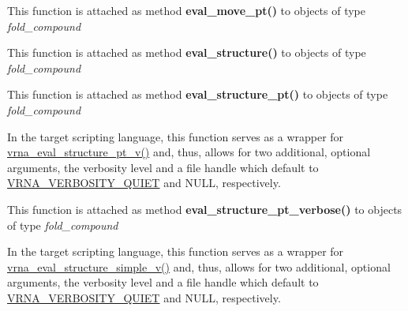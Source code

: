 \begin{DoxyRefList}
%
 This function is attached as method {\bfseries{eval\+\_\+move\+\_\+pt()}} to objects of type {\itshape fold\+\_\+compound}  
\item[Global \mbox{\hyperlink{group__eval_ga58f199f1438d794a265f3b27fc8ea631}{vrna\+\_\+eval\+\_\+structure}} (vrna\+\_\+fold\+\_\+compound\+\_\+t $\ast$vc, const char $\ast$structure)]\label{wrappers__wrappers000043}%
%
 This function is attached as method {\bfseries{eval\+\_\+structure()}} to objects of type {\itshape fold\+\_\+compound}  
\item[Global \mbox{\hyperlink{group__eval_gadbd09372ddfd7a450bbd590c96a6bfe4}{vrna\+\_\+eval\+\_\+structure\+\_\+pt}} (vrna\+\_\+fold\+\_\+compound\+\_\+t $\ast$vc, const short $\ast$pt)]\label{wrappers__wrappers000044}%
%
 This function is attached as method {\bfseries{eval\+\_\+structure\+\_\+pt()}} to objects of type {\itshape fold\+\_\+compound}  
\item[Global \mbox{\hyperlink{group__eval_ga0bba59b4d6e53461088666ff4aece7b0}{vrna\+\_\+eval\+\_\+structure\+\_\+pt\+\_\+simple}} (const char $\ast$string, const short $\ast$pt)]\label{wrappers__wrappers000071}%
%
 In the target scripting language, this function serves as a wrapper for \mbox{\hyperlink{group__eval_ga2c6533ba0afe4c88d335d8f1e0e2a48e}{vrna\+\_\+eval\+\_\+structure\+\_\+pt\+\_\+v()}} and, thus, allows for two additional, optional arguments, the verbosity level and a file handle which default to \mbox{\hyperlink{group__eval_gaf4afe19780b61b4962c613bde324128b}{V\+R\+N\+A\+\_\+\+V\+E\+R\+B\+O\+S\+I\+T\+Y\+\_\+\+Q\+U\+I\+ET}} and N\+U\+LL, respectively.  
\item[Global \mbox{\hyperlink{group__eval_ga8a517cfeeae8c376ae7b1e0c401d38b4}{vrna\+\_\+eval\+\_\+structure\+\_\+pt\+\_\+verbose}} (vrna\+\_\+fold\+\_\+compound\+\_\+t $\ast$vc, const short $\ast$pt, F\+I\+LE $\ast$file)]\label{wrappers__wrappers000046}%
%
 This function is attached as method {\bfseries{eval\+\_\+structure\+\_\+pt\+\_\+verbose()}} to objects of type {\itshape fold\+\_\+compound}  
\item[Global \mbox{\hyperlink{group__eval_ga7e5273464b775d4130245681312c1369}{vrna\+\_\+eval\+\_\+structure\+\_\+simple}} (const char $\ast$string, const char $\ast$structure)]\label{wrappers__wrappers000053}%
%
 In the target scripting language, this function serves as a wrapper for \mbox{\hyperlink{group__eval_gacd6278343e77d13f1d53588e50d303bc}{vrna\+\_\+eval\+\_\+structure\+\_\+simple\+\_\+v()}} and, thus, allows for two additional, optional arguments, the verbosity level and a file handle which default to \mbox{\hyperlink{group__eval_gaf4afe19780b61b4962c613bde324128b}{V\+R\+N\+A\+\_\+\+V\+E\+R\+B\+O\+S\+I\+T\+Y\+\_\+\+Q\+U\+I\+ET}} and N\+U\+LL, respectively.  

\end{DoxyRefList}
